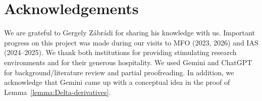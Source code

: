 \documentclass[11pt,oneside]{amsart}
\numberwithin{equation}{section}
\theoremstyle{remark}
\theoremstyle{plain}
\begin{document}
\section*{Acknowledgements}
We are grateful to Gergely Zábrádi for sharing his knowledge with us. Important progress on this project was made during our visits to MFO (2023, 2026) and IAS (2024--2025). We thank both institutions for providing stimulating research environments and for their generous hospitality. We used Gemini and ChatGPT for background/literature review and partial proofreading. In addition, we acknowledge that Gemini came up with a conceptual idea in the proof of Lemma~\ref{lemma:Delta-derivatives}.



\end{document}
